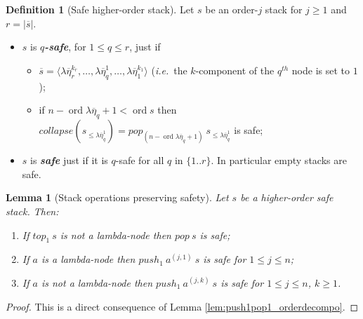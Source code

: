 \documentclass{article}
\newcommand{\ord}{\mathop{\mathrm{ord}}}
\newcommand{\prefixof}{\leqslant}
\newcommand\defname[1]{{\bf\em #1}\index{#1}}
\newtheorem{lemma}{Lemma}[section]
\theoremstyle{remark}
\theoremstyle{definition}
\newtheorem{definition}{Definition}[section]
\newcommand\orddec\overline
\begin{document}
\begin{definition}[Safe higher-order stack]
\label{dfn:safestack} Let $s$ be an order-$j$ stack for $j\geq1$ and $r
= |\orddec{s}|$.
\begin{itemize}[-]
\item $s$ is \defname{$q$-safe}, for $1 \leq q \leq r$, just if 
\begin{itemize}
\item $\orddec{s} = \langle \lambda \overline{\eta}_r^{k_r}, \ldots ,
\lambda \overline{\eta}_q^1, \ldots , \lambda
\overline{\eta}_1^{k_1} \rangle$ ({\it i.e.}~the
$k$-component of the $q^{th}$ node is set to $1$);

\item if $n-\ord{\lambda \overline{\eta}_q}+1 < \ord{s}$ then  $collapse (s_{\prefixof \lambda \overline{\eta}_q^1}) = pop_{(n-\ord{\lambda \overline{\eta}_q}+1)}\  s_{\prefixof \lambda \overline{\eta}_q^1}$ is safe;
\end{itemize}
\item $s$ is \defname{safe} just if it is $q$-safe for all $q$ in $\{1..r\}$. In particular empty stacks are safe.
\end{itemize}
\end{definition}


\begin{lemma}[Stack operations preserving safety]
\label{lem:push1pop1_preserves_safety} Let $s$ be a higher-order
safe stack. Then:
\begin{enumerate}
  \item If $top_1\ s$ is not a lambda-node then $pop\ s$ is safe;
  \item If $a$ is a lambda-node then $push_1\ a^{(j,1)}\ s$ is safe for $1 \leq j \leq n$;
  \item If $a$ is not a lambda-node then $push_1\ a^{(j,k)}\ s$
is safe for $1 \leq j \leq n$, $k \geq 1$.
\end{enumerate}
\end{lemma}
\begin{proof}
This is a direct consequence of Lemma
\ref{lem:push1pop1_orderdecompo}.
\end{proof}
\end{document}
